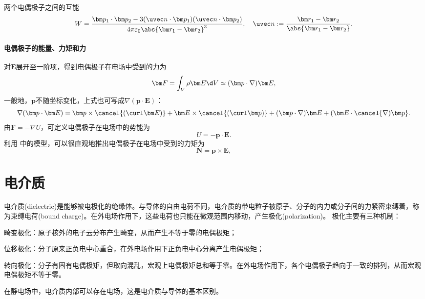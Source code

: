 \begin{example}
    {两个电偶极子之间的互能}{}
    \begin{equation}
        W=\frac{\bm p_1\cdot\bm p_2-3(\uvec n\cdot\bm p_1)(\uvec n\cdot\bm p_2)}{4\pi\varepsilon_0\abs{\bm r_1-\bm r_2}^3},\quad\uvec n:=\frac{\bm r_1-\bm r_2}{\abs{\bm r_1-\bm r_2}}.
    \end{equation}
\end{example}

\paragraph{电偶极子的能量、力矩和力}

对$\bm E$展开至一阶项，得到电偶极子在电场中受到的力为
\begin{equation}
    \label{eqn:F=(p dot nabla)E}
    \bm F=\int_V\rho\bm E\d V\simeq(\bm p\cdot\nabla)\bm E,
\end{equation}
一般地，$\bm p$不随坐标变化，上式也可写成$\nabla(\bm p\cdot\bm E)$： 
\[
    \nabla(\bm p\cdot\bm E)=\bm p\times\cancel{(\curl\bm E)}+\bm E\times\cancel{(\curl\bm p)}+(\bm p\cdot\nabla)\bm E+(\bm E\cdot\cancel{\nabla)\bm p}.
\]
由$\bm F=-\nabla U$，可定义电偶极子在电场中的势能为
\begin{equation}
    U=-\bm p\cdot\bm E.
\end{equation}
利用 中的模型，可以很直观地推出电偶极子在电场中受到的力矩为
\begin{equation}
    \bm N=\bm p\times\bm E,
\end{equation}

\section{电介质}
\label{sec:dielectric}

电介质(dielectric)是能够被电极化的绝缘体。与导体的自由电荷不同，电介质的带电粒子被原子、分子的内力或分子间的力紧密束缚着，称为束缚电荷(bound charge)。在外电场作用下，这些电荷也只能在微观范围内移动，产生极化(polarization)。
极化主要有三种机制：
\begin{compactenum}
    \item 畸变极化：原子核外的电子云分布产生畸变，从而产生不等于零的电偶极矩；
    \item 位移极化：分子原来正负电中心重合，在外电场作用下正负电中心分离产生电偶极矩；
    \item 转向极化：分子有固有电偶极矩，但取向混乱，宏观上电偶极矩总和等于零。在外电场作用下，各个电偶极子趋向于一致的排列，从而宏观电偶极矩不等于零。
\end{compactenum}
在静电场中，电介质内部可以存在电场，这是电介质与导体的基本区别。
